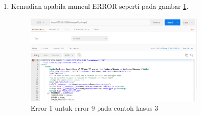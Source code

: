 \begin{enumerate}
\item Kemudian apabila muncul ERROR seperti pada gambar \ref{fig:err1}.
\begin{figure}[!htbp]
	\centerline{\includegraphics[width=0.85\textwidth]{figures/10/err1.PNG}}
	\caption{Error 1 untuk error 9 pada contoh kasus 3}
	\label{fig:err1}
\end{figure}


\end{enumerate}
